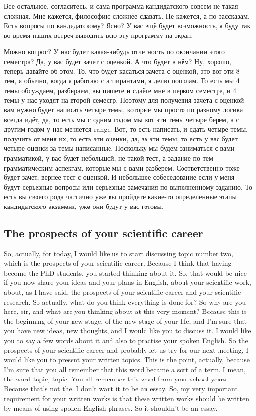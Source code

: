 \documentclass[main.tex]{subfiles}
\begin{document}
Все остальное, согласитесь, и сама программа кандидатского совсем не такая сложная.
Мне кажется, философию сложнее сдавать.
Не кажется, а по рассказам.
Есть вопросы по кандидатскому?
Ясно?
У вас ещё будет возможность, я буду так во время наших встреч выводить всю эту программу на экран.

Можно вопрос? У нас будет какая-нибудь отчетность по окончании этого семестра?
Да, у вас будет зачет с оценкой.
А что будет в нём?
Ну, хорошо, теперь давайте об этом.
То, что будет касаться зачета с оценкой, это вот эти 8 тем, я обычно, когда я работаю с аспирантами, я делю пополам.
То есть мы 4 темы обсуждаем, разбираем, вы пишете и сдаёте мне в первом семестре, и 4 темы у нас уходят на второй семестр.
Поэтому для получения зачета с оценкой вам нужно будет написать четыре темы, которые мы просто по разному логика всегда идёт, да, то есть мы с одним годом мы вот эти темы четыре берем, а с другим годом у нас меняется range.
Вот, то есть написать, и сдать четыре темы, получить от меня их, то есть эти оценки, да, за эти темы, то есть у вас будет четыре оценки за темы написанные.
Поскольку мы будем заниматься с вами грамматикой, у вас будет небольшой, не такой тест, а задание по тем грамматическим аспектам, которые мы с вами разберем.
Соответственно тоже будет зачет, вернее тест с оценкой.
И небольшое собеседование если у меня будут серьезные вопросы или серьезные замечания по выполненному заданию.
То есть вы своего рода частично уже вы пройдете какие-то определенные этапы кандидатского экзамена, уже они будут у вас готовы.

\subsection{The prospects of your scientific career}

So, actually, for today, I would like us to start discussing topic number two, which is the prospects of your scientific career.
Because I think that having become the PhD students, you started thinking about it.
So, that would be nice if you now share your ideas and your plans in English, about your scientific work, about, as I have said, the prospects of your scientific career and your scientific research.
So actually, what do you think everything is done for?
So why are you here, sir, and what are you thinking about at this very moment?
Because this is the beginning of your new stage, of the new stage of your life, and I'm sure that you have new ideas, new thoughts, and I would like you to discuss it.
I would like you to say a few words about it and also to practise your spoken English.
So the prospects of your scientific career and probably let us try for our next meeting, I would like you to present your written topics.
This is the point, actually, because I'm sure that you all remember that this word became a sort of a term.
I mean, the word topic, topic.
You all remember this word from your school years.
Because that's not the, I don't want it to be an essay.
So, my very important requirement for your written works is that these written works should be written by means of using spoken English phrases.
So it shouldn't be an essay.
\end{document}
